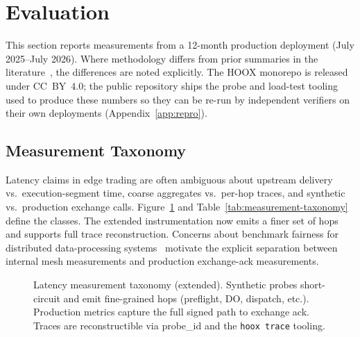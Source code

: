 \section{Evaluation}
\label{sec:evaluation}

This section reports measurements from a 12-month production deployment (July 2025--July 2026). Where methodology differs from prior summaries in the literature~\cite{mcsherry2013cost,wang2018peeking,shahrad2020serverless}, the differences are noted explicitly. The \textsc{HOOX} monorepo is released under CC~BY~4.0; the public repository ships the probe and load-test tooling used to produce these numbers so they can be re-run by independent verifiers on their own deployments (Appendix~\ref{app:repro}).

\subsection{Measurement Taxonomy}

Latency claims in edge trading are often ambiguous about upstream delivery vs.\ execution-segment time, coarse aggregates vs.\ per-hop traces, and synthetic vs.\ production exchange calls. Figure~\ref{fig:latency-taxonomy} and Table~\ref{tab:measurement-taxonomy} define the classes. The extended instrumentation now emits a finer set of hops and supports full trace reconstruction. Concerns about benchmark fairness for distributed data-processing systems~\cite{mcsherry2013cost} motivate the explicit separation between internal mesh measurements and production exchange-ack measurements.

\begin{figure}[!htbp]
  \centering
  \ifhooxusetikz
    \resizebox{\linewidth}{!}{}%
  \else
  \fi
  \caption{Latency measurement taxonomy (extended). Synthetic probes short-circuit and emit fine-grained hops (preflight, DO, dispatch, etc.). Production metrics capture the full signed path to exchange ack. Traces are reconstructible via probe\_id and the \texttt{hoox trace} tooling.}
  \label{fig:latency-taxonomy}
\end{figure}

